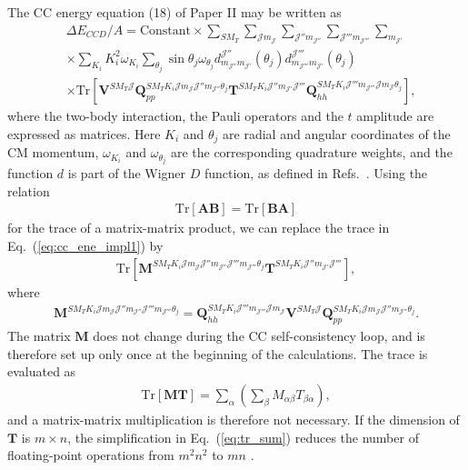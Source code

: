 \documentclass[a4paper,12pt]{report}
\begin{document}
The CC energy equation (18) of Paper II may be 
written as
\begin{align} \label{eq:cc_ene_impl1}
  &\Delta E_{CCD}/A = \text{Constant}\times 
  \sum_{SM_{T}}\sum_{\mathcal{J}m_{\mathcal{J}}}
  \sum_{\mathcal{J}''m_{\mathcal{J}''}}
  \sum_{\mathcal{J}'''m_{\mathcal{J}'''}}\sum_{m_{\mathcal{J}'}} 
  \nonumber \\
  & \times \sum_{K_{i}}K_{i}^{2}\omega_{K_{i}}\sum_{\theta_{j}}
  \sin \theta_{j}\omega_{\theta_{j}}
  d_{m_{\mathcal{J}''}m_{\mathcal{J}'}}^{\mathcal{J}''}(\theta_{j})
  d_{m_{\mathcal{J}'''}m_{\mathcal{J}'}}^{\mathcal{J}'''}(\theta_{j})
  \nonumber \\
  & \times \text{Tr} \left[ \mathbf{V}^{SM_{T}\mathcal{J}}
    \mathbf{Q}_{pp}^{SM_{T}K_{i}\mathcal{J}m_{\mathcal{J}}
      \mathcal{J}''m_{\mathcal{J}''}\theta_{j}}
    \mathbf{T}^{SM_{T}K_{i}\mathcal{J}''m_{\mathcal{J}'}\mathcal{J}'''}
    \mathbf{Q}_{hh}^{SM_{T}K_{i}\mathcal{J}'''m_{\mathcal{J}'''}
    \mathcal{J}m_{\mathcal{J}}\theta_{j}}
    \right],
\end{align} 
where the two-body interaction, the Pauli operators and 
the $t$ amplitude are expressed as matrices. Here
$K_{i}$ and $\theta_{j}$ are radial and angular coordinates
of the CM momentum, $\omega_{K_{i}}$ and $\omega_{\theta_{j}}$
are the corresponding quadrature weights, and the function 
$d$ is part of the Wigner $D$ function, as defined in
Refs.~\cite{varshalovich,baardsen}.
Using the
relation 
\begin{align}
  \text{Tr} \left[ \mathbf{A}\mathbf{B}\right] = 
  \text{Tr} \left[ \mathbf{B}\mathbf{A}\right]
\end{align} 
for the trace of a matrix-matrix product, we can replace
the trace in Eq.~(\ref{eq:cc_ene_impl1}) by
\begin{align}
  \text{Tr}\left[ \mathbf{M}^{SM_{T}K_{i}\mathcal{J}m_{\mathcal{J}}
    \mathcal{J}''m_{\mathcal{J}''}\mathcal{J}'''m_{\mathcal{J}'''}
    \theta_{j}} 
    \mathbf{T}^{SM_{T}K_{i}\mathcal{J}''m_{\mathcal{J}'}\mathcal{J}'''}\right],
\end{align}
where 
\begin{align}
  \mathbf{M}^{SM_{T}K_{i}\mathcal{J}m_{\mathcal{J}}
    \mathcal{J}''m_{\mathcal{J}''}\mathcal{J}'''
    m_{\mathcal{J}'''}\theta_{j}} = 
  \mathbf{Q}_{hh}^{SM_{T}K_{i}\mathcal{J}'''m_{\mathcal{J}'''}
    \mathcal{J}m_{\mathcal{J}}}
  \mathbf{V}^{SM_{T}\mathcal{J}}
  \mathbf{Q}_{pp}^{SM_{T}K_{i}\mathcal{J}m_{\mathcal{J}}
    \mathcal{J}''m_{\mathcal{J}''}\theta_{j}}.
\end{align}
The matrix $\mathbf{M}$ does not change during the CC
self-consistency loop, and is therefore set up only
once at the beginning of the calculations. The trace
is evaluated as
\begin{align} \label{eq:tr_sum}
  \text{Tr} \left[ \mathbf{M}\mathbf{T}\right] 
  = \sum_{\alpha }\left( \sum_{\beta }M_{\alpha \beta }T_{\beta \alpha }\right),
\end{align} 
and a matrix-matrix multiplication is therefore not
necessary. If the dimension of $\mathbf{T}$ is 
$m\times n$, the simplification in Eq.~(\ref{eq:tr_sum}) 
reduces the number of floating-point operations 
from $m^{2}n^{2}$ to $mn$ \cite{golub}. 
\end{document}
